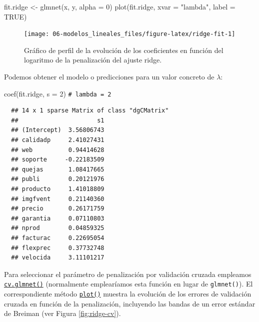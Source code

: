 \documentclass[
]{book}
\newenvironment{Shaded}{\begin{snugshade}}{\end{snugshade}}
\newcommand{\AttributeTok}[1]{\textcolor[rgb]{0.77,0.63,0.00}{#1}}
\newcommand{\CommentTok}[1]{\textcolor[rgb]{0.56,0.35,0.01}{\textit{#1}}}
\newcommand{\ConstantTok}[1]{\textcolor[rgb]{0.00,0.00,0.00}{#1}}
\newcommand{\DecValTok}[1]{\textcolor[rgb]{0.00,0.00,0.81}{#1}}
\newcommand{\FunctionTok}[1]{\textcolor[rgb]{0.00,0.00,0.00}{#1}}
\newcommand{\NormalTok}[1]{#1}
\newcommand{\OtherTok}[1]{\textcolor[rgb]{0.56,0.35,0.01}{#1}}
\newcommand{\StringTok}[1]{\textcolor[rgb]{0.31,0.60,0.02}{#1}}
\theoremstyle{break}
\theoremstyle{nonumberplain}
\renewcommand{\CommentTok}[1]{\textcolor[rgb]{0.41,0.41,0.41}{\texttt{#1}}}
\begin{document}
\begin{Shaded}
\begin{Highlighting}[]
\NormalTok{fit.ridge }\OtherTok{\textless{}{-}} \FunctionTok{glmnet}\NormalTok{(x, y, }\AttributeTok{alpha =} \DecValTok{0}\NormalTok{)}
\FunctionTok{plot}\NormalTok{(fit.ridge, }\AttributeTok{xvar =} \StringTok{"lambda"}\NormalTok{, }\AttributeTok{label =} \ConstantTok{TRUE}\NormalTok{)}
\end{Highlighting}
\end{Shaded}

\begin{figure}[!htb]

{\centering \texttt{[image: 06-modelos\_lineales\_files/figure-latex/ridge-fit-1]} 

}

\caption{Gráfico de perfil de la evolución de los coeficientes en función del logaritmo de la penalización del ajuste ridge.}\label{fig:ridge-fit}
\end{figure}

Podemos obtener el modelo o predicciones para un valor concreto de \(\lambda\):

\begin{Shaded}
\begin{Highlighting}[]
\FunctionTok{coef}\NormalTok{(fit.ridge, }\AttributeTok{s =} \DecValTok{2}\NormalTok{) }\CommentTok{\# lambda = 2}
\end{Highlighting}
\end{Shaded}

\begin{verbatim}
  ## 14 x 1 sparse Matrix of class "dgCMatrix"
  ##                      s1
  ## (Intercept)  3.56806743
  ## calidadp     2.41027431
  ## web          0.94414628
  ## soporte     -0.22183509
  ## quejas       1.08417665
  ## publi        0.20121976
  ## producto     1.41018809
  ## imgfvent     0.21140360
  ## precio       0.26171759
  ## garantia     0.07110803
  ## nprod        0.04859325
  ## facturac     0.22695054
  ## flexprec     0.37732748
  ## velocida     3.11101217
\end{verbatim}

Para seleccionar el parámetro de penalización por validación cruzada empleamos \href{https://glmnet.stanford.edu/reference/cv.glmnet.html}{\texttt{cv.glmnet()}} (normalmente emplearíamos esta función en lugar de \texttt{glmnet()}).
El correspondiente método \href{https://glmnet.stanford.edu/reference/plot.cv.glmnet.html}{\texttt{plot()}} muestra la evolución de los errores de validación cruzada en función de la penalización, incluyendo las bandas de un error estándar de Breiman (ver Figura \ref{fig:ridge-cv}).
\end{document}
